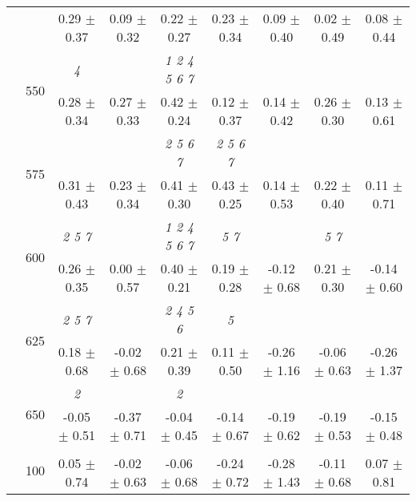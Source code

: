 \begin{table}[h]
{\begin{tabular}{
        ccccccccc}
 & & \cellcolor[HTML]{EFEFEF} 0.29 $\pm$ 0.37& \cellcolor[HTML]{EFEFEF} 0.09 $\pm$ 0.32& \cellcolor[HTML]{EFEFEF} 0.22 $\pm$ 0.27& \cellcolor[HTML]{EFEFEF} 0.23 $\pm$ 0.34& \cellcolor[HTML]{EFEFEF} 0.09 $\pm$ 0.40& \cellcolor[HTML]{EFEFEF} 0.02 $\pm$ 0.49& \cellcolor[HTML]{EFEFEF} 0.08 $\pm$ 0.44 \\ 
 & \multirow{2}{*}{550}& \textit{ 4 }& & \textit{ 1 2 4 5 6 7 }& & & &  \\ 
 & & 0.28 $\pm$ 0.34& 0.27 $\pm$ 0.33& 0.42 $\pm$ 0.24& 0.12 $\pm$ 0.37& 0.14 $\pm$ 0.42& 0.26 $\pm$ 0.30& 0.13 $\pm$ 0.61 \\ 
 & \multirow{2}{*}{575}& \cellcolor[HTML]{EFEFEF} & \cellcolor[HTML]{EFEFEF} & \cellcolor[HTML]{EFEFEF} \textit{ 2 5 6 7 }& \cellcolor[HTML]{EFEFEF} \textit{ 2 5 6 7 }& \cellcolor[HTML]{EFEFEF} & \cellcolor[HTML]{EFEFEF} & \cellcolor[HTML]{EFEFEF}  \\ 
 & & \cellcolor[HTML]{EFEFEF} 0.31 $\pm$ 0.43& \cellcolor[HTML]{EFEFEF} 0.23 $\pm$ 0.34& \cellcolor[HTML]{EFEFEF} 0.41 $\pm$ 0.30& \cellcolor[HTML]{EFEFEF} 0.43 $\pm$ 0.25& \cellcolor[HTML]{EFEFEF} 0.14 $\pm$ 0.53& \cellcolor[HTML]{EFEFEF} 0.22 $\pm$ 0.40& \cellcolor[HTML]{EFEFEF} 0.11 $\pm$ 0.71 \\ 
 & \multirow{2}{*}{600}& \textit{ 2 5 7 }& & \textit{ 1 2 4 5 6 7 }& \textit{ 5 7 }& & \textit{ 5 7 }&  \\ 
 & & 0.26 $\pm$ 0.35& 0.00 $\pm$ 0.57& 0.40 $\pm$ 0.21& 0.19 $\pm$ 0.28& -0.12 $\pm$ 0.68& 0.21 $\pm$ 0.30& -0.14 $\pm$ 0.60 \\ 
 & \multirow{2}{*}{625}& \cellcolor[HTML]{EFEFEF} \textit{ 2 5 7 }& \cellcolor[HTML]{EFEFEF} & \cellcolor[HTML]{EFEFEF} \textit{ 2 4 5 6 }& \cellcolor[HTML]{EFEFEF} \textit{ 5 }& \cellcolor[HTML]{EFEFEF} & \cellcolor[HTML]{EFEFEF} & \cellcolor[HTML]{EFEFEF}  \\ 
 & & \cellcolor[HTML]{EFEFEF} 0.18 $\pm$ 0.68& \cellcolor[HTML]{EFEFEF} -0.02 $\pm$ 0.68& \cellcolor[HTML]{EFEFEF} 0.21 $\pm$ 0.39& \cellcolor[HTML]{EFEFEF} 0.11 $\pm$ 0.50& \cellcolor[HTML]{EFEFEF} -0.26 $\pm$ 1.16& \cellcolor[HTML]{EFEFEF} -0.06 $\pm$ 0.63& \cellcolor[HTML]{EFEFEF} -0.26 $\pm$ 1.37 \\ 
 & \multirow{2}{*}{650}& \textit{ 2 }& & \textit{ 2 }& & & &  \\ 
 & & -0.05 $\pm$ 0.51& -0.37 $\pm$ 0.71& -0.04 $\pm$ 0.45& -0.14 $\pm$ 0.67& -0.19 $\pm$ 0.62& -0.19 $\pm$ 0.53& -0.15 $\pm$ 0.48 \\ \midrule 
 & \multirow{2}{*}{100}& & & & & & &  \\ 
 & & 0.05 $\pm$ 0.74& -0.02 $\pm$ 0.63& -0.06 $\pm$ 0.68& -0.24 $\pm$ 0.72& -0.28 $\pm$ 1.43& -0.11 $\pm$ 0.68& 0.07 $\pm$ 0.81 \\ 

\end{tabular}}
\end{table}
